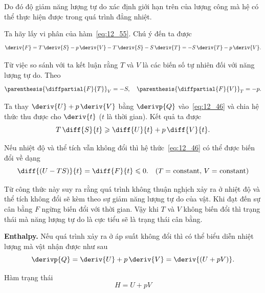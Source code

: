 \noindent
Do đó độ giảm năng lượng tự do xác định giới hạn trên của lượng công mà hệ có thể thực hiện được trong quá trình đẳng nhiệt.

Ta hãy lấy vi phân của hàm~\eqref{eq:12_55}. Chú ý đến  ta được
\begin{equation}\label{eq:12_59}
	\deriv{F} = T\,\deriv{S} -  p\,\deriv{V} - T\,\deriv{S} - S\,\deriv{T} = -S\,\deriv{T} - p\,\deriv{V}.
\end{equation}

\noindent
Từ việc so sánh với  ta kết luận rằng $T$ và $V$ là các biến số tự nhiên đối với năng lượng tự do. Theo 
\begin{equation}\label{eq:12_60}
	\parenthesis{\diffpartial{F}{T}}_V = -S,\quad \parenthesis{\diffpartial{F}{V}}_T = -p.
\end{equation}

Ta thay $\deriv{U}+p\,\deriv{V}$ bằng $\derivp{Q}$ vào~\eqref{eq:12_46} và chia hệ thức thu được cho $\deriv{t}$ ($t$ là thời gian). Kết quả ta được
\begin{equation}\label{eq:12_61}
	T\,\diff{S}{t} \geqslant \diff{U}{t} + p\,\diff{V}{t}.
\end{equation}

\noindent
Nếu nhiệt độ và thể tích vẫn không đổi thì hệ thức~\eqref{eq:12_46} có thể được biến đổi về dạng
\vspace{2pt}
\begin{equation}\label{eq:12_62}
	\diff{(U-TS)}{t} = \diff{F}{t} \leqslant 0.\quad \text{($T = $ constant, $V = $ constant)}
\end{equation}

\noindent
Từ công thức này suy ra rằng quá trình không thuận nghịch xảy ra ở nhiệt độ và thể tích không đổi sẽ kèm theo sự giảm năng lượng tự do của vật. Khi đạt đến sự cân bằng $F$ ngừng biến đổi với thời gian. Vậy khi $T$ và $V$ không biến đổi thì trạng thái mà năng lượng tự do là cực tiểu sẽ là trạng thái cân bằng.

\textbf{Enthalpy.} Nếu quá trình xảy ra ở áp suất không đổi thì có thể biểu diễn nhiệt lượng mà vật nhận được như sau
\begin{equation}\label{eq:12_63}
	\derivp{Q} = \deriv{U} + p\,\deriv{V} = \deriv{(U + pV)}.
\end{equation}

\noindent
Hàm trạng thái
\begin{equation}\label{eq:12_64}
	H = U + pV
\end{equation}

